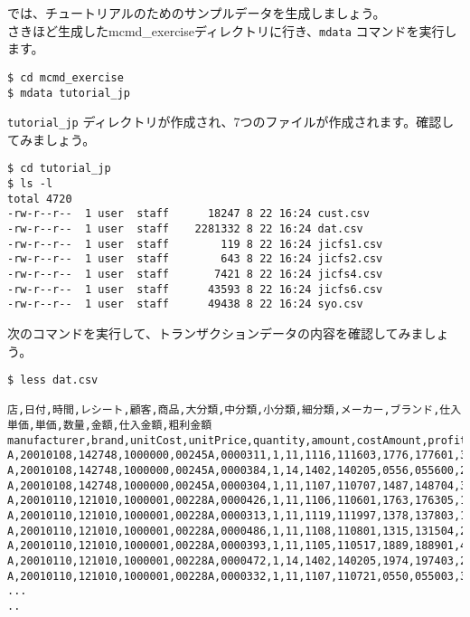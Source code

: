 では、チュートリアルのためのサンプルデータを生成しましょう。\\

さきほど生成したmcmd\_exerciseディレクトリに行き、\verb|mdata| コマンドを実行します。\\

\begin{verbatim}
$ cd mcmd_exercise
$ mdata tutorial_jp
\end{verbatim}

\verb|tutorial_jp| ディレクトリが作成され、7つのファイルが作成されます。確認してみましょう。\\

\begin{verbatim}
$ cd tutorial_jp
$ ls -l 
total 4720
-rw-r--r--  1 user  staff      18247 8 22 16:24 cust.csv
-rw-r--r--  1 user  staff    2281332 8 22 16:24 dat.csv
-rw-r--r--  1 user  staff        119 8 22 16:24 jicfs1.csv
-rw-r--r--  1 user  staff        643 8 22 16:24 jicfs2.csv
-rw-r--r--  1 user  staff       7421 8 22 16:24 jicfs4.csv
-rw-r--r--  1 user  staff      43593 8 22 16:24 jicfs6.csv
-rw-r--r--  1 user  staff      49438 8 22 16:24 syo.csv
\end{verbatim}
 
次のコマンドを実行して、トランザクションデータの内容を確認してみましょう。\\

\begin{verbatim}
$ less dat.csv

店,日付,時間,レシート,顧客,商品,大分類,中分類,小分類,細分類,メーカー,ブランド,仕入単価,単価,数量,金額,仕入金額,粗利金額
manufacturer,brand,unitCost,unitPrice,quantity,amount,costAmount,profit
A,20010108,142748,1000000,00245A,0000311,1,11,1116,111603,1776,177601,339,441,1,441,339,102
A,20010108,142748,1000000,00245A,0000384,1,14,1402,140205,0556,055600,286,372,1,372,286,86
A,20010108,142748,1000000,00245A,0000304,1,11,1107,110707,1487,148704,343,446,1,446,343,103
A,20010110,121010,1000001,00228A,0000426,1,11,1106,110601,1763,176305,177,231,5,1155,885,270
A,20010110,121010,1000001,00228A,0000313,1,11,1119,111997,1378,137803,185,241,6,1446,1110,336
A,20010110,121010,1000001,00228A,0000486,1,11,1108,110801,1315,131504,208,271,1,271,208,63
A,20010110,121010,1000001,00228A,0000393,1,11,1105,110517,1889,188901,410,533,6,3198,2460,738
A,20010110,121010,1000001,00228A,0000472,1,14,1402,140205,1974,197403,267,348,1,348,267,81
A,20010110,121010,1000001,00228A,0000332,1,11,1107,110721,0550,055003,354,461,1,461,354,107
...
..
\end{verbatim}

